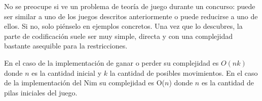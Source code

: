 No se preocupe si ve un problema de teoría de juego durante un concurso: puede ser similar a uno de los juegos descritos anteriormente o puede reducirse a uno de ellos. Si no, solo piénselo en ejemplos concretos. Una vez que lo descubres, la parte de codificación suele ser muy simple, directa y con una complejidad bastante asequible para la restricciones.

En el caso de la implementación de ganar o perder su complejidad es $O(nk)$ donde $n$ es la cantidad inicial y $k$ la cantidad de posibles movimientos. En el caso de la implementación del Nim su complejidad es O($n$) donde $n$ es la cantidad de pilas iniciales del juego.